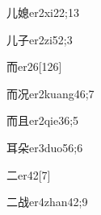\begin{verbete}{儿媳}{er2xi2}{2;13}
\end{verbete}

\begin{verbete}{儿子}{er2zi5}{2;3}
\end{verbete}

\begin{verbete}{而}{er2}{6}[126]
\end{verbete}

\begin{verbete}{而况}{er2kuang4}{6;7}
\end{verbete}

\begin{verbete}{而且}{er2qie3}{6;5}
\end{verbete}

\begin{verbete}{耳朵}{er3duo5}{6;6}
\end{verbete}

\begin{verbete}{二}{er4}{2}[7]
\end{verbete}

\begin{verbete}{二战}{er4zhan4}{2;9}
\end{verbete}

